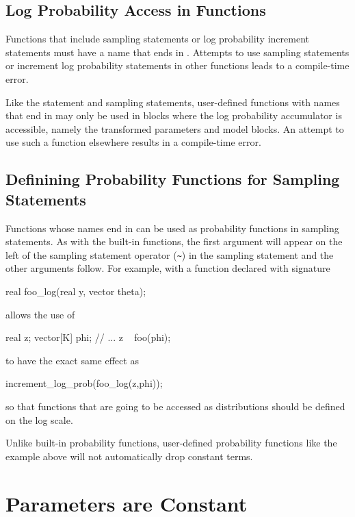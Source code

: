 \subsection{Log Probability Access in Functions}

Functions that include sampling statements or log probability
increment statements must have a name that ends in .
Attempts to use sampling statements or increment log probability
statements in other functions leads to a compile-time error.

Like the  statement and sampling
statements, user-defined functions with names that end in 
may only be used in blocks where the log probability accumulator is
accessible, namely the transformed parameters and model blocks.  An
attempt to use such a function elsewhere results in a compile-time
error.

\subsection{Definining Probability Functions for Sampling Statements}

Functions whose names end in  can be used as probability
functions in sampling statements.  As with the built-in functions, the
first argument will appear on the left of the sampling
statement operator (\Verb|~|) in the sampling statement and the other
arguments follow.  For example, with a function declared with signature
%
\begin{stancode}
real foo_log(real y, vector theta);
\end{stancode}
%
allows the use of
%
\begin{stancode}
real z;
vector[K] phi;
// ...
z ~ foo(phi);
\end{stancode}
%
to have the exact same effect as
%
\begin{stancode}
increment_log_prob(foo_log(z,phi));
\end{stancode}
%
so that functions that are going to be accessed as distributions
should be defined on the log scale.

Unlike built-in probability functions, user-defined probability
functions like the example  above will not automatically
drop constant terms.

\section{Parameters are Constant}

